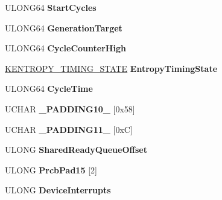 \begin{DoxyCompactItemize}
\item 
\mbox{\label{struct___k_p_r_c_b_a2e4e79e30cdb142b9e34672a59d938ed}} 
U\+L\+O\+N\+G64 {\bfseries Start\+Cycles}
\item 
\mbox{\label{struct___k_p_r_c_b_a4c9a0c85cb7656f04c49fef14837db5b}} 
U\+L\+O\+N\+G64 {\bfseries Generation\+Target}
\item 
\mbox{\label{struct___k_p_r_c_b_ac0a3d09e9ddd1a65ef86b31096165c80}} 
U\+L\+O\+N\+G64 {\bfseries Cycle\+Counter\+High}
\item 
\mbox{\label{struct___k_p_r_c_b_adbde39b543120598979f4cf32ce32890}} 
\hyperlink{struct___k_e_n_t_r_o_p_y___t_i_m_i_n_g___s_t_a_t_e}{K\+E\+N\+T\+R\+O\+P\+Y\+\_\+\+T\+I\+M\+I\+N\+G\+\_\+\+S\+T\+A\+TE} {\bfseries Entropy\+Timing\+State}
\item 
\mbox{\label{struct___k_p_r_c_b_ab410c9f8d95fcf8c8a5c964a35866088}} 
U\+L\+O\+N\+G64 {\bfseries Cycle\+Time}
\item 
\mbox{\label{struct___k_p_r_c_b_af3a210ee7595309b23dd5aa9134ebbc3}} 
U\+C\+H\+AR {\bfseries \+\_\+\+P\+A\+D\+D\+I\+N\+G10\+\_\+} \mbox{[}0x58\mbox{]}
\item 
\mbox{\label{struct___k_p_r_c_b_a073b5cd5715ff2da34af7f773e42bfad}} 
U\+C\+H\+AR {\bfseries \+\_\+\+P\+A\+D\+D\+I\+N\+G11\+\_\+} \mbox{[}0x\+C\mbox{]}
\item 
\mbox{\label{struct___k_p_r_c_b_a527966c1740a52e17d67041a8e386c89}} 
U\+L\+O\+NG {\bfseries Shared\+Ready\+Queue\+Offset}
\item 
\mbox{\label{struct___k_p_r_c_b_a8adba0dc4dfc1e317045eb96a1d7a118}} 
U\+L\+O\+NG {\bfseries Prcb\+Pad15} \mbox{[}2\mbox{]}
\item 
\mbox{\label{struct___k_p_r_c_b_a21661cc0d1f122a7c654d3ef1bd8bf05}} 
U\+L\+O\+NG {\bfseries Device\+Interrupts}
\item 
\mbox{\label{struct___k_p_r_c_b_a43cd01c729a1565f4d7b74514e5b4603}} 

\end{DoxyCompactItemize}
